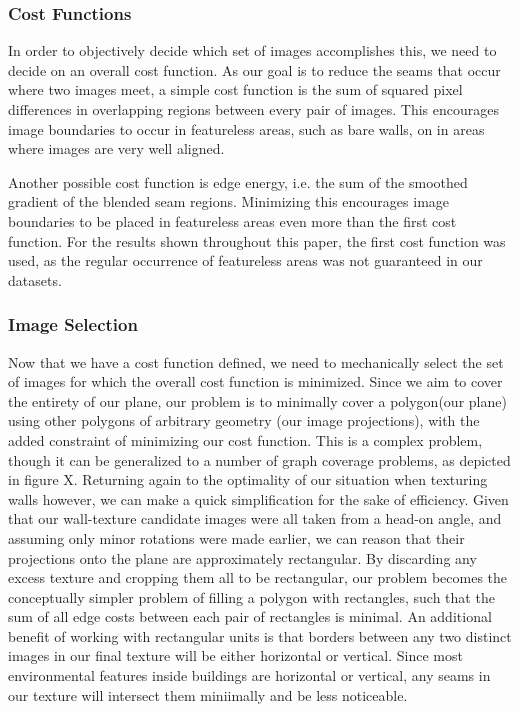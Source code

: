 \documentclass[10pt,twocolumn,letterpaper]{article}
\begin{document}
\subsubsection{Cost Functions}

In order to objectively decide which set of images accomplishes this,
we need to decide on an overall cost function. As our goal is to reduce
the seams that occur where two images meet, a simple cost function is
the sum of squared pixel differences in overlapping regions between
every pair of images. This encourages image boundaries to occur in
featureless areas, such as bare walls, on in areas where images are
very well aligned.

Another possible cost function is edge energy, i.e. the sum of the
smoothed gradient of the blended seam regions. Minimizing this
encourages image boundaries to be placed in featureless areas even
more than the first cost function. For the results shown throughout
this paper, the first cost function was used, as the regular
occurrence of featureless areas was not guaranteed in our datasets.

\subsubsection{Image Selection}

Now that we have a cost function defined, we need to mechanically
select the set of images for which the overall cost function is
minimized. Since we aim to cover the entirety of our plane, our
problem is to minimally cover a polygon(our plane) using other
polygons of arbitrary geometry (our image projections), with the added
constraint of minimizing our cost function. This is a complex problem,
though it can be generalized to a number of graph coverage problems,
as depicted in figure X. Returning again to the optimality of our
situation when texturing walls however, we can make a quick
simplification for the sake of efficiency. Given that our wall-texture
candidate images were all taken from a head-on angle, and assuming only minor rotations were made earlier, we can reason
that their projections onto the plane are approximately
rectangular. By discarding any excess texture and cropping them
all to be rectangular, our problem becomes the conceptually simpler
problem of filling a polygon with rectangles, such that the sum of all
edge costs between each pair of rectangles is minimal. An additional
benefit of working with rectangular units is that borders between any
two distinct images in our final texture will be either horizontal or
vertical. Since most environmental features inside buildings are horizontal
or vertical, any seams in our texture will intersect them miniimally
and be less noticeable.
\end{document}
